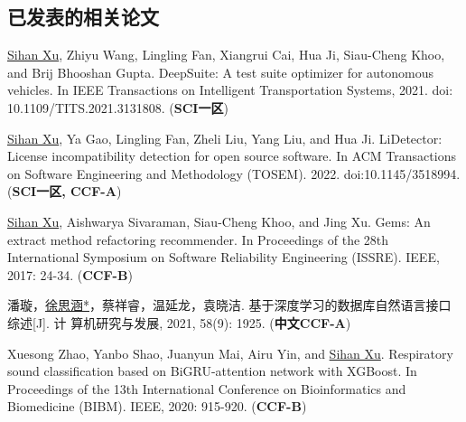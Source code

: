 \documentclass[a4paper,zihao=-4]{article}
\begin{document}
\subsection{已发表的相关论文}

\begin{enumerate}[label={[\arabic*]}]
	\item \underline{Sihan Xu}, Zhiyu Wang, Lingling Fan, Xiangrui Cai, Hua Ji,
	      Siau-Cheng Khoo, and Brij Bhooshan Gupta. DeepSuite: A test suite optimizer
	      for autonomous vehicles. In IEEE Transactions on Intelligent Transportation
	      Systems, 2021. doi: 10.1109/TITS.2021.3131808. (\textbf{SCI一区})
	
	\item \underline{Sihan Xu}, Ya Gao, Lingling Fan, Zheli Liu, Yang Liu, and
	      Hua Ji. LiDetector: License incompatibility detection for open source
	      software. In ACM Transactions on Software Engineering and Methodology
	      (TOSEM). 2022. doi:10.1145/3518994. (\textbf{SCI一区, CCF-A})
	\item \underline{Sihan Xu}, Aishwarya Sivaraman, Siau-Cheng Khoo, and Jing
	      Xu. Gems: An extract method refactoring recommender. In Proceedings of the
	      28th International Symposium on Software Reliability Engineering (ISSRE).
	      IEEE, 2017: 24-34. (\textbf{CCF-B})

	      \iffalse
	\item \underline{Sihan Xu}, Ya Gao, Xiangrui Cai, Zhiyu Wang, and Hua Ji.
	      Effective Multi-Fault Localization Based on Fault-Relevant Statistics. In
	      Proceedings of the 45th Annual Computers, Software, and Applications Conference
	      (COMPSAC). IEEE, 2021: 998-1003. (\textbf{CCF-C})

	\item \underline{Sihan Xu}, Sen Zhang, Weijing Wang, Xinya Cao, Chenkai Guo,
	      and Jing Xu. Method name suggestion with hierarchical attention
	      networks[C]//Proceedings of the 2019 ACM SIGPLAN Workshop on Partial
	      Evaluation and Program Manipulation (PEPM). 2019: 10-21. (\textbf{CCF-C})
	      \fi

	\item 潘璇，\underline{徐思涵*}，蔡祥睿，温延龙，袁晓洁. 基于深度学习的数据库自然语言接口综述[J]. 计
	算机研究与发展, 2021, 58(9): 1925. (\textbf{中文CCF-A})

	\item Xuesong Zhao, Yanbo Shao, Juanyun Mai, Airu Yin, and \underline{Sihan
		      Xu}. Respiratory sound classification based on BiGRU-attention network with
	      XGBoost. In Proceedings of the 13th International Conference on
	      Bioinformatics and Biomedicine (BIBM). IEEE, 2020: 915-920. (\textbf{CCF-B})


\end{enumerate}
\end{document}
